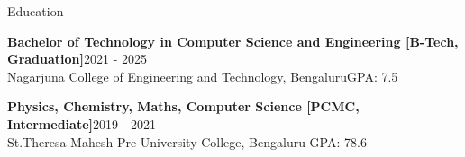 \documentclass{resume} %
\begin{document}





\begin{rSection}{Education}

{\bf Bachelor of Technology in Computer Science and Engineering [B-Tech, Graduation]}\hfill {2021 - 2025}\\
Nagarjuna College of Engineering and Technology, Bengaluru\hfill {GPA: 7.5}

{\bf Physics, Chemistry, Maths, Computer Science [PCMC, Intermediate]}\hfill {2019 - 2021}\\
St.Theresa Mahesh Pre-University College, Bengaluru \hfill GPA: 78.6



\end{rSection}
\end{document}
